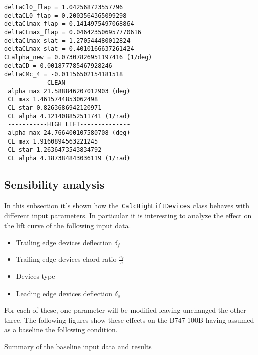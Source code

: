 \bigskip
\lstset{language=Java}
\begin{lstlisting}[caption={B747-100B test results}, captionpos=b, tabsize=2]
deltaCl0_flap = 1.042568723557796
deltaCL0_flap = 0.2003564365099298
deltaClmax_flap = 0.1414975497068864
deltaCLmax_flap = 0.046423506957770616
deltaClmax_slat = 1.270544480012824
deltaCLmax_slat = 0.4010166637261424
CLalpha_new = 0.07307826951197416 (1/deg)
deltaCD = 0.001877785467928246
deltaCMc_4 = -0.01156502154181518
 -----------CLEAN-------------- 
 alpha max 21.588846207012903 (deg)
 CL max 1.4615744853062498
 CL star 0.8263686942120971
 CL alpha 4.121408852511741 (1/rad)
 -----------HIGH LIFT-------------- 
 alpha max 24.766400107580708 (deg)
 CL max 1.9160894563221245
 CL star 1.2636473543834792
 CL alpha 4.187384843036119 (1/rad)
\end{lstlisting}
%
\subsection{Sensibility analysis}
%
In this subsection it's shown how the~\lstinline[language=Java]!CalcHighLiftDevices! class behaves with different input parameters. In particular it is interesting to analyze the effect on the lift curve of the following input data.
%
\begin{itemize}
\item Trailing edge devices deflection $\delta_f$
\item Trailing edge devices chord ratio $\frac{c_f}{c}$ 
\item Devices type 
\item Leading edge devices deflection $\delta_s$
\end{itemize}
%
For each of these, one parameter will be modified leaving unchanged the other three. The following figures show these effects on the B747-100B having assumed as a baseline the following condition.
%
\begin{table}[H]
\caption{Summary of the baseline input data and results}
\end{table}
